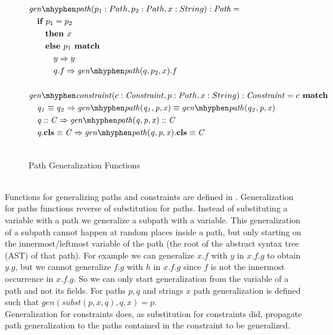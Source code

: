 \begin{figure}[t]
\centering
\begin{align*}
&\genp(p_1: Path, p_2: Path, x: String):\mIt{Path} = \\
&\quad\If p_1 = p_2\\
&\qquad \Then x\\
&\qquad \Else p_1 \match\\
&\qquad\quad y \Rightarrow y\\
&\qquad\quad q.f \Rightarrow \genp(q, p_2, x).f\\
\\
&\genc(c: \Constr, p: Path, x: String): \Constr = c \match\\
&\quad \case{\pathEq{q_1}{q_2}}
  {\pathEq
    {\genp(q_1, p, x)}
    {\genp(q_2, p, x)}}\\
&\quad \case{\instOf{q}{C}}
  {\instOf{\genp(q, p, x)}{C}}\\
&\quad \case{\instBy{q}{C}}
  {\instBy{\genp(q, p, x)}{C}}\\\\
\end{align*}
\caption{Path Generalization Functions}
\label{fig:axioms-general-gen}
\end{figure}\\
Functions for generalizing paths and constraints are defined in .
Generalization for paths functions reverse of substitution for paths.
Instead of substituting a variable with a path we generalize a subpath with a variable.
This generalization of a subpath cannot happen at random places inside a path,
but only starting on the innermost/leftmost variable of the path (the root of the abstract syntax tree (AST) of that path).
For example we can generalize $x.f$ with $y$ in $x.f.g$ to obtain $y.g$,
but we cannot generalize $f.g$ with $h$ in $x.f.g$
since $f$ is not the innermost occurrence in $x.f.g$.
So we can only start generalization from the variable of a path and not its fields.
For paths $p, q$ and strings $x$ path generalization is defined
such that $gen(subst(p, x, q), q, x) = p$.\\
Generalization for constraints does,
as substitution for constraints did,
propagate path generalization to the paths contained in the constraint
to be generalized.

